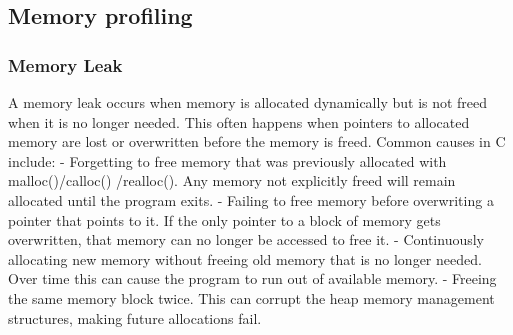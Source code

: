 \documentclass [ titlepage ]{article}
\begin{document}
\subsection{Memory profiling}
\subsubsection{Memory Leak}
A memory leak occurs when memory is allocated dynamically but is not freed when it is no longer needed. This often happens when pointers
 to allocated memory are lost or overwritten before the memory is freed. Common causes in C include: \newline
- Forgetting to free memory that was previously allocated with malloc()/calloc()  /realloc(). Any memory not explicitly freed will remain
 allocated until the program exits. \newline
- Failing to free memory before overwriting a pointer that points to it. If the only pointer to a block of memory gets overwritten, that memory
 can no longer be accessed to free it. \newline
- Continuously allocating new memory without freeing old memory that is no longer needed. Over time this can cause the program to run out
 of available memory. \newline
- Freeing the same memory block twice. This can corrupt the heap memory management structures, making future allocations fail. \newline
\end{document}
